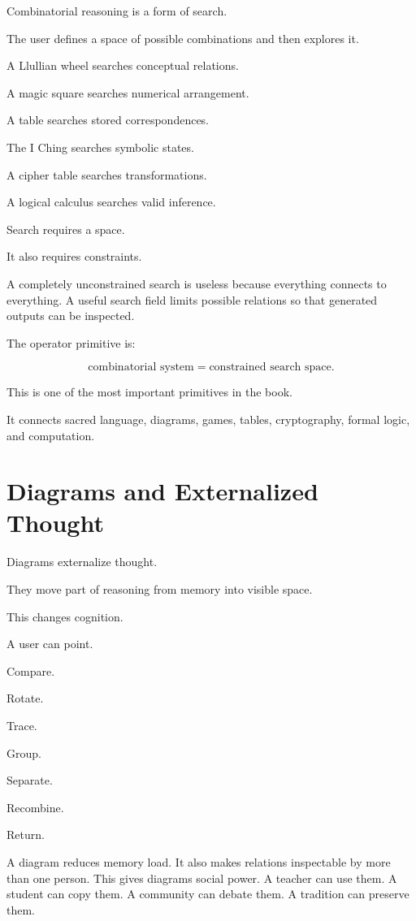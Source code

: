 \documentclass[11pt]{book}
\begin{document}
Combinatorial reasoning is a form of search.

The user defines a space of possible combinations and then explores it.

A Llullian wheel searches conceptual relations.

A magic square searches numerical arrangement.

A table searches stored correspondences.

The I Ching searches symbolic states.

A cipher table searches transformations.

A logical calculus searches valid inference.

Search requires a space.

It also requires constraints.

A completely unconstrained search is useless because everything connects to everything. A useful search field limits possible relations so that generated outputs can be inspected.

The operator primitive is:

\[
\text{combinatorial system} = \text{constrained search space}.
\]

This is one of the most important primitives in the book.

It connects sacred language, diagrams, games, tables, cryptography, formal logic, and computation.

\section{Diagrams and Externalized Thought}

Diagrams externalize thought.

They move part of reasoning from memory into visible space.

This changes cognition.

A user can point.

Compare.

Rotate.

Trace.

Group.

Separate.

Recombine.

Return.

A diagram reduces memory load. It also makes relations inspectable by more than one person. This gives diagrams social power. A teacher can use them. A student can copy them. A community can debate them. A tradition can preserve them.
\end{document}
